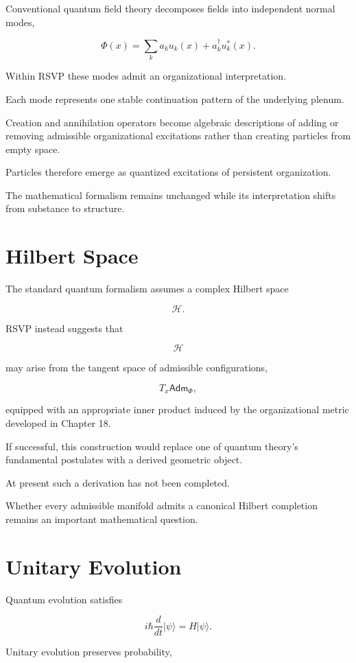 \documentclass[11pt,oneside]{book}
\numberwithin{equation}{chapter}
\theoremstyle{definition}
\theoremstyle{plain}
\newcommand{\Adm}{\mathsf{Adm}}
\begin{document}
Conventional quantum field theory decomposes fields into independent normal
modes,

\[
\Phi(x)
=
\sum_k
a_k
u_k(x)
+
a_k^\dagger
u_k^*(x).
\]

Within RSVP these modes admit an organizational interpretation.

Each mode represents one stable continuation pattern of the underlying
plenum.

Creation and annihilation operators become algebraic descriptions of adding
or removing admissible organizational excitations rather than creating
particles from empty space.

Particles therefore emerge as quantized excitations of persistent
organization.

The mathematical formalism remains unchanged while its interpretation shifts
from substance to structure.

\section{Hilbert Space}

The standard quantum formalism assumes a complex Hilbert space

\[
\mathcal H.
\]

RSVP instead suggests that

\[
\mathcal H
\]

may arise from the tangent space of admissible configurations,

\[
T_x
\Adm_\Phi,
\]

equipped with an appropriate inner product induced by the organizational
metric developed in Chapter 18.

If successful, this construction would replace one of quantum theory's
fundamental postulates with a derived geometric object.

At present such a derivation has not been completed.

Whether every admissible manifold admits a canonical Hilbert completion
remains an important mathematical question.

\section{Unitary Evolution}

Quantum evolution satisfies

\[
i
\hbar
\frac{d}{dt}
|\psi\rangle
=
H
|\psi\rangle.
\]

Unitary evolution preserves probability,
\end{document}
